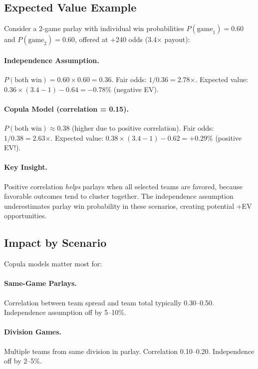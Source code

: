 \documentclass[12pt]{report}  %
\numberwithin{equation}{section}
\theoremstyle{plain}
\theoremstyle{definition}
\theoremstyle{remark}
\begin{document}
\subsection{Expected Value Example}
Consider a 2-game parlay with individual win probabilities $P(\text{game}_1) = 0.60$ and $P(\text{game}_2) = 0.60$, offered at +240 odds (3.4× payout):

\paragraph{Independence Assumption.}
$P(\text{both win}) = 0.60 \times 0.60 = 0.36$. Fair odds: $1/0.36 = 2.78$×. Expected value: $0.36 \times (3.4 - 1) - 0.64 = -0.78\%$ (negative EV).

\paragraph{Copula Model (correlation = 0.15).}
$P(\text{both win}) \approx 0.38$ (higher due to positive correlation). Fair odds: $1/0.38 = 2.63$×. Expected value: $0.38 \times (3.4 - 1) - 0.62 = +0.29\%$ (positive EV!).

\paragraph{Key Insight.}
Positive correlation \textit{helps} parlays when all selected teams are favored, because favorable outcomes tend to cluster together. The independence assumption underestimates parlay win probability in these scenarios, creating potential +EV opportunities.

\subsection{Impact by Scenario}
Copula models matter most for:

\paragraph{Same-Game Parlays.}
Correlation between team spread and team total typically 0.30--0.50. Independence assumption off by 5--10\%.

\paragraph{Division Games.}
Multiple teams from same division in parlay. Correlation 0.10--0.20. Independence off by 2--5\%.
\end{document}
